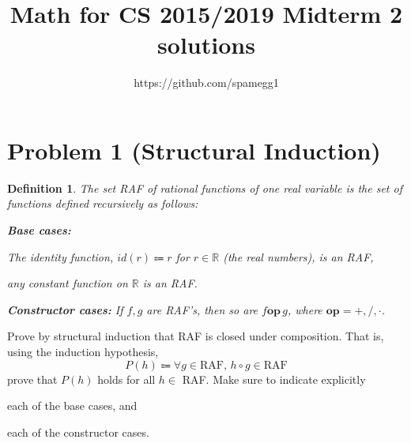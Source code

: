 \documentclass[14pt]{extarticle}
\title{Math for CS 2015/2019 Midterm 2 solutions}
\author{https://github.com/spamegg1}
\newtheorem{defn}{Definition}
\begin{document}
\maketitle
\tableofcontents

\section{Problem 1 (Structural Induction)}
\begin{defn} The set RAF of rational functions of one real variable is the set of functions defined recursively as follows:

{\bf Base cases:}

The identity function, $id(r) \Coloneqq r$ for $r \in \mathbb{R}$ (the real numbers), is an RAF,

any constant function on $\mathbb{R}$ is an RAF.

{\bf Constructor cases:} If $f, g$ are RAF’s, then so are
$f \textbf{op}\, g$, where $\textbf{op} = +, /, \cdot$.
\end{defn}
Prove by structural induction that RAF is closed under composition. That is, using the induction hypothesis,
$$
P(h) \Coloneqq \forall g \in \text{RAF, } h \circ g  \in \text{RAF}
$$
prove that $P(h)$ holds for all $h \in$ RAF. Make sure to indicate explicitly

each of the base cases, and

each of the constructor cases. 
\end{document}
